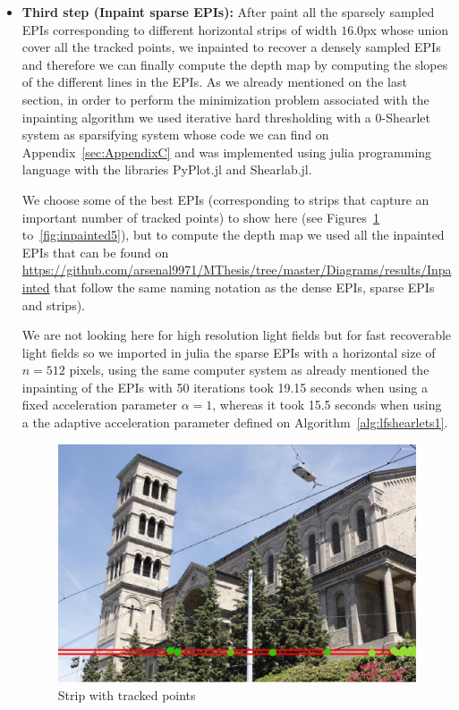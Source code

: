\begin{itemize}
\item \textbf{Third step (Inpaint sparse EPIs):} After paint all the sparsely sampled EPIs corresponding to different horizontal strips of width $16.0$px whose union cover all the tracked points, we inpainted to recover a densely sampled EPIs and therefore we can finally compute the depth map by computing the slopes of the different lines in the EPIs. As we already mentioned on the last section, in order to perform the minimization problem associated with the inpainting algorithm we used iterative hard thresholding with a $0$-Shearlet system as sparsifying system whose code we can find on Appendix~\ref{sec:AppendixC} and was implemented using julia programming language with the libraries PyPlot.jl and Shearlab.jl. 

\bigskip

We choose some of the best EPIs (corresponding to strips that capture an important number of tracked points) to show here (see Figures~\ref{fig:strip1} to~\ref{fig:inpainted5}), but to compute the depth map we used all the inpainted EPIs that can be found on \url{https://github.com/arsenal9971/MThesis/tree/master/Diagrams/results/Inpainted} that follow the same naming notation as the dense EPIs, sparse EPIs and strips).

\bigskip

We are not looking here for high resolution light fields but for fast recoverable light fields so we imported in julia the sparse EPIs with a horizontal size of $n=512$ pixels, using the same computer system as already mentioned the inpainting of the EPIs with 50 iterations took 19.15 seconds when using a fixed acceleration parameter $\alpha = 1$, whereas it took 15.5 seconds when using a the adaptive acceleration parameter defined on Algorithm~\ref{alg:lfshearlets1}.

\begin{figure}[h!]
\centering
\includegraphics[width = 0.7 \textwidth]{./Diagrams/results/EPIs/392_8_102_7_15_4_strip.png}
\caption{Strip with tracked points}
\label{fig:strip1}
\end{figure}


\end{itemize}
